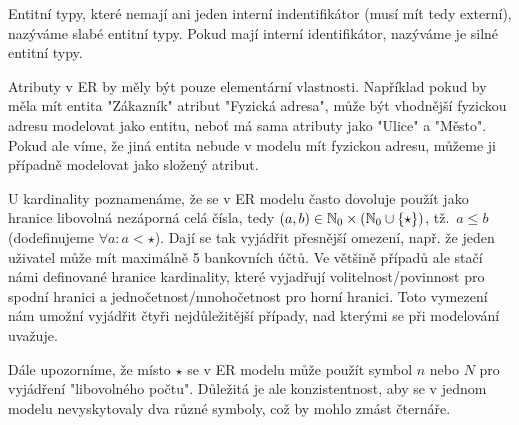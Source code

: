 Entitní typy, které nemají ani jeden interní indentifikátor (musí mít tedy externí), nazýváme slabé entitní typy.
Pokud mají interní identifikátor, nazýváme je silné entitní typy.

Atributy v ER by měly být pouze elementární vlastnosti.
Například pokud by měla mít entita "Zákazník" atribut "Fyzická adresa", může být vhodnější fyzickou adresu modelovat jako entitu, neboť má sama atributy jako "Ulice" a "Město".
Pokud ale víme, že jiná entita nebude v modelu mít fyzickou adresu, můžeme ji případně modelovat jako složený atribut.

U kardinality poznamenáme, že se v ER modelu často dovoluje použít jako hranice libovolná nezáporná celá čísla, tedy $(a, b)\in \mathbb N_0\times \left(\mathbb N_0 \cup \left\{\star\right\}\right)$, tž.~$a\leq b$ (dodefinujeme $\forall a\colon a < \star$).
Dají se tak vyjádřit přesnější omezení, např. že jeden uživatel může mít maximálně 5 bankovních účtů.
Ve většině případů ale stačí námi definované hranice kardinality, které vyjadřují volitelnost/povinnost pro spodní hranici a jednočetnost/mnohočetnost pro horní hranici.
Toto vymezení nám umožní vyjádřit čtyři nejdůležitější případy, nad kterými se při modelování uvažuje.

Dále upozorníme, že místo $\star$ se v ER modelu může použít symbol $n$ nebo $N$ pro vyjádření "libovolného počtu".
Důležitá je ale konzistentnost, aby se v jednom modelu nevyskytovaly dva různé symboly, což by mohlo zmást čternáře.

